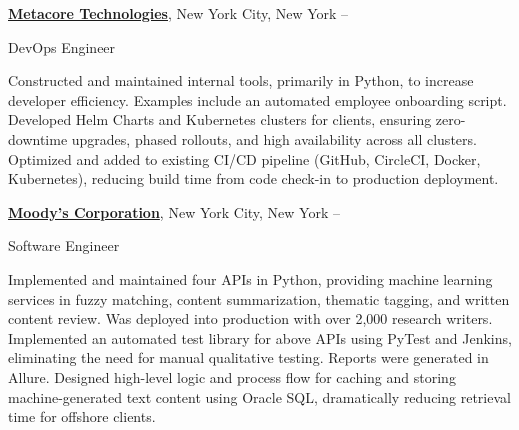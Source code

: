 \documentclass[letterpaper,MMMyyyy,nonstopmode]{simpleresumecv}
\begin{document}
\begin{Body}
\Entry
\href{https://metacore.tech/}
{\textbf{Metacore Technologies}},
New York City, New York
\hfill
{} --

\Gap
\BulletItem
DevOps Engineer
\begin{Detail}
\SubBulletItem
Constructed and maintained internal tools, primarily in Python, to increase developer efficiency. Examples include an automated employee onboarding script.
\SubBulletItem
Developed Helm Charts and Kubernetes clusters for clients, ensuring zero-downtime upgrades, phased rollouts, and high availability across all clusters.
\SubBulletItem
Optimized and added to existing CI/CD pipeline (GitHub, CircleCI, Docker, Kubernetes), reducing build time from code check-in to production deployment.
\end{Detail}



\BigGap
\Entry
\href{http://www.moodys.com}
{\textbf{Moody's Corporation}},
New York City, New York
\hfill
{} --

\Gap
\BulletItem
Software Engineer
\begin{Detail}
\SubBulletItem
Implemented and maintained four APIs in Python, providing machine learning services in fuzzy matching, content summarization, thematic tagging, and written content review. Was deployed into production with over 2,000 research writers.
\SubBulletItem
Implemented an automated test library for above APIs using PyTest and Jenkins, eliminating the need for manual qualitative testing. Reports were generated in Allure.
\SubBulletItem
Designed high-level logic and process flow for caching and storing machine-generated text content using Oracle SQL, dramatically reducing retrieval time for offshore clients.
\end{Detail}




\end{Body}
\end{document}
